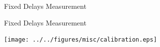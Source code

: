 \documentclass[compress,red]{beamer}
\begin{document}
\logo{}
\begin{frame}{Fixed Delays Measurement}


\end{frame}
\begin{frame}{Fixed Delays Measurement}

  \begin{center}
  \texttt{[image: ../../figures/misc/calibration.eps]}
  \end{center}

\end{frame}
% 
% 
% 
\end{document}
